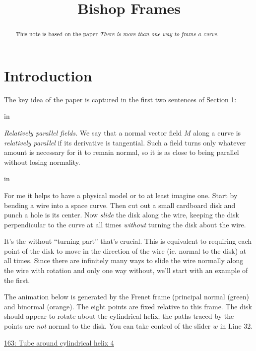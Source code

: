 \documentclass{ximera}
\title{Bishop Frames}
\newcommand{\pskip}{\vskip 0.1 in}
\begin{document}
\begin{abstract}
This note is based on the paper \emph{There is more than one way to frame a curve}.
\end{abstract}
\maketitle


\section*{Introduction}
The key idea of the paper is captured in the first two sentences of Section 1:

\pskip

\emph{Relatively parallel fields.} We say that a normal vector field $M$ along a curve is \emph{relatively parallel} if its derivative is tangential. Such a field turns only whatever amount is necessary for it to remain normal, so it is as close to being parallel without losing normality.

\pskip

For me it helps to have a physical model or to at least imagine one. Start by bending a wire into a space curve. Then cut out a small cardboard disk and punch a hole is its center. Now \emph{slide} the disk along the wire, keeping the disk perpendicular to the curve at all times \emph{without} turning the disk about the wire.

It's the without ``turning part'' that's crucial. This is equivalent to requiring each point of the disk to move in the direction of the wire (ie. normal to the disk) at all times. Since there are infinitely many ways to slide the wire normally along the wire with rotation and only one way without, we'll start with an example of the first.


\begin{exploration}
The animation below is generated by the Frenet frame (principal normal (green) and binormal (orange). The eight points are fixed relative to this frame. The disk should appear to rotate about the cylindrical helix; the paths traced by the points are \emph{not} normal to the disk. You can take control of the slider $w$ in Line 32.

\begin{onlineOnly}
    \begin{center}
\end{center}
\end{onlineOnly}

\href{https://www.desmos.com/3d/vroc5lhox8}{163: Tube around cylindrical helix 4}
\end{exploration}
\end{document}
